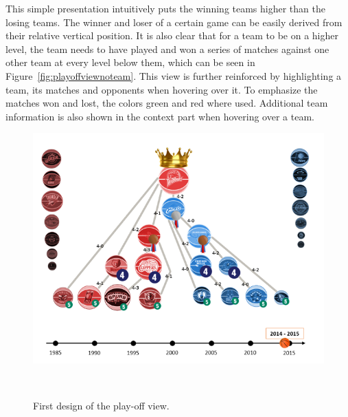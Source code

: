 \documentclass[]{sigchi}
\begin{document}
This simple presentation intuitively puts the winning teams higher than the
losing teams. The winner and loser of a certain game can be easily derived from 
their relative vertical position. It is also clear that for a team to be on a 
higher level, the team needs to have played and won a series of matches against 
one other team at every level below them, which can be seen in Figure~\ref{fig:playoffviewnoteam}. This view is further reinforced by highlighting a team, its matches and opponents when hovering over it. To emphasize the matches won and lost, the colors green and red where used. Additional team information is also shown in the context part when hovering over a team.


\begin{figure}
\centering
  \includegraphics[width=1.0\columnwidth]{figures/playoffviewfirstdesign}
  \caption{First design of the play-off view.}~\label{fig:firstdesignplayoffview}
\end{figure}
\end{document}
